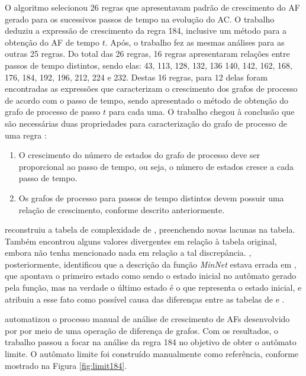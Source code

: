 \documentclass[12pt,a4paper]{article}
\begin{document}
O algoritmo selecionou 26 regras que apresentavam padrão
de crescimento do AF gerado para os sucessivos passos de tempo na evolução
do AC. O trabalho deduziu a expressão de crescimento da regra 184, inclusive
um método para a obtenção do AF de tempo $t$. Após, o trabalho fez as mesmas
análises para as outras 25 regras. Do total das 26 regras, 16 regras
apresentaram relações entre passos de tempo distintos, sendo elas: 43, 113,
128, 132, 136 140, 142, 162, 168, 176, 184, 192, 196, 212, 224 e 232. Destas
16 regras, para 12 delas foram encontradas as expressões que caracterizam o
crescimento dos grafos de processo de acordo com o passo de tempo, sendo
apresentado o método de obtenção do grafo de processo de passo $t$ para cada uma.
O trabalho chegou à conclusão que são necessárias duas
propriedades para caracterização do grafo de processo de uma regra
:

\begin{enumerate}
\item O crescimento do número de estados do grafo de processo deve ser
proporcional ao passo de tempo, ou seja, o número de estados cresce
a cada passo de tempo.

\item Os grafos de processo para passos de tempo distintos devem possuir uma
relação de crescimento, conforme descrito anteriormente.
\end{enumerate}

 reconstruiu a tabela de complexidade de
, preenchendo novas lacunas na tabela. Também
encontrou alguns valores divergentes em relação à tabela original, embora
não tenha mencionado nada em relação a tal discrepância.
, posteriormente, identificou que a descrição da função
\emph{MinNet} estava errada em , que apontava o primeiro
estado como sendo o estado inicial no autômato gerado pela função, mas na
verdade o último estado é o que representa o estado inicial, e atribuiu
a esse fato como possível causa das diferenças entre as tabelas de
 e .

 automatizou o processo manual de análise de crescimento
de AFs desenvolvido por  por meio de uma operação
de diferença de grafos. Com os resultados, o trabalho passou a focar na análise
da regra 184 no objetivo de obter o autômato limite. O autômato limite
foi construído manualmente como referência, conforme mostrado na Figura
\ref{fig:limit184}.
\end{document}
